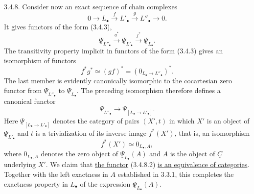 
3.4.8. Consider now an exact sequence of chain complexes
\begin{equation}\tag{3.4.8.1}
 0\longrightarrow L_\bullet\xrightarrow{f}L'_\bullet
 \xrightarrow{g}L''_\bullet\longrightarrow0.
\end{equation}
It gives functors of the form (3.4.3),
\[
 \underline\Psi_{L''_\bullet}\xrightarrow{g^*}
 \underline\Psi_{L'_\bullet}\xrightarrow{f^*}
 \underline\Psi_{L_\bullet}.
\]
The transitivity property implicit in functors of the form (3.4.3)
gives an isomorphism of functors
\[
 f^*g^*\simeq(gf)^*=(0_{L_\bullet\to L''_\bullet})^*.
\]
The last member is evidently canonically isomorphic to the
cocartesian zero functor from $\underline\Psi_{L''_\bullet}$ to
$\underline\Psi_{L_\bullet}$.  The preceding isomorphism therefore
defines a canonical functor
\begin{equation}\tag{3.4.8.2}
 \underline\Psi_{L''_\bullet}\longrightarrow
 \underline\Psi_{[L_\bullet\longrightarrow L'_\bullet]}.
\end{equation}
Here $\underline\Psi_{[L_\bullet\longrightarrow L'_\bullet]}$
denotes the category of pairs $(X',t)$ in which $X'$ is an object of
$\underline\Psi_{L'_\bullet}$ and $t$ is a trivialization of its
inverse image $f^*(X')$, that is, an isomorphism
\[
 f^*(X')\simeq0_{L_\bullet,A},
\]
where $0_{L_\bullet,A}$ denotes the zero object of
$\underline\Psi_{L_\bullet}(A)$ and $A$ is the object of
$\underline C$ underlying $X'$.  We claim that \underline{the
functor} (3.4.8.2) \underline{is an equivalence of categories}.
Together with the left exactness in $A$ established in 3.3.1, this
completes the exactness property in $L_\bullet$ of the expression
$\underline\Psi_{L_\bullet}(A)$.

